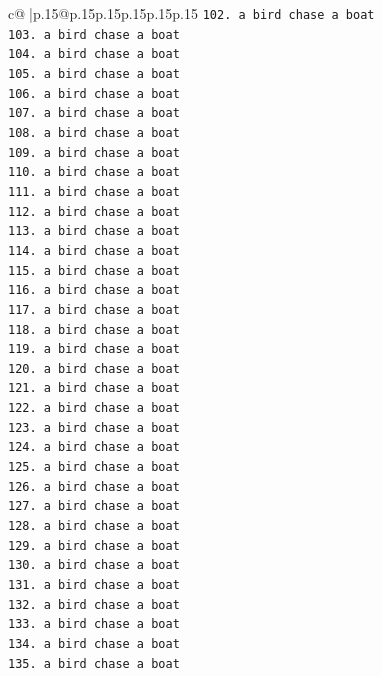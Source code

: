 \documentclass{article}
\begin{document}
{\begin{supertabular}{c@{$\;$}|p{.15\linewidth}@{}p{.15\linewidth}p{.15\linewidth}p{.15\linewidth}p{.15\linewidth}p{.15\linewidth}}
{{{\texttt{102. a bird chase a boat} \\
\texttt{103. a bird chase a boat} \\
\texttt{104. a bird chase a boat} \\
\texttt{105. a bird chase a boat} \\
\texttt{106. a bird chase a boat} \\
\texttt{107. a bird chase a boat} \\
\texttt{108. a bird chase a boat} \\
\texttt{109. a bird chase a boat} \\
\texttt{110. a bird chase a boat} \\
\texttt{111. a bird chase a boat} \\
\texttt{112. a bird chase a boat} \\
\texttt{113. a bird chase a boat} \\
\texttt{114. a bird chase a boat} \\
\texttt{115. a bird chase a boat} \\
\texttt{116. a bird chase a boat} \\
\texttt{117. a bird chase a boat} \\
\texttt{118. a bird chase a boat} \\
\texttt{119. a bird chase a boat} \\
\texttt{120. a bird chase a boat} \\
\texttt{121. a bird chase a boat} \\
\texttt{122. a bird chase a boat} \\
\texttt{123. a bird chase a boat} \\
\texttt{124. a bird chase a boat} \\
\texttt{125. a bird chase a boat} \\
\texttt{126. a bird chase a boat} \\
\texttt{127. a bird chase a boat} \\
\texttt{128. a bird chase a boat} \\
\texttt{129. a bird chase a boat} \\
\texttt{130. a bird chase a boat} \\
\texttt{131. a bird chase a boat} \\
\texttt{132. a bird chase a boat} \\
\texttt{133. a bird chase a boat} \\
\texttt{134. a bird chase a boat} \\
\texttt{135. a bird chase a boat} \\
}}}
\end{supertabular}}
\end{document}
